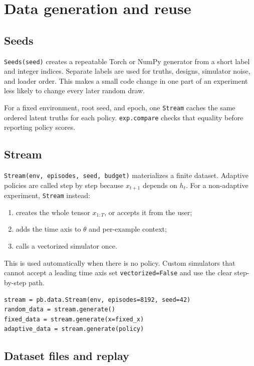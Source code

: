 \documentclass[11pt]{article}
\begin{document}
\section{Data generation and reuse}

\subsection{Seeds}

\texttt{Seeds(seed)} creates a repeatable Torch or NumPy generator from a short
label and integer indices. Separate labels are used for truths, designs, simulator
noise, and loader order. This makes a small code change in one part of an
experiment less likely to change every later random draw.

For a fixed environment, root seed, and epoch, one \texttt{Stream} caches the same
ordered latent truths for each policy. \texttt{exp.compare} checks that equality
before reporting policy scores.

\subsection{Stream}

\texttt{Stream(env, episodes, seed, budget)} materializes a finite dataset.
Adaptive policies are called step by step because $x_{t+1}$ depends on $h_t$.
For a non-adaptive experiment, \texttt{Stream} instead:
\begin{enumerate}
  \item creates the whole tensor $x_{1:T}$, or accepts it from the user;
  \item adds the time axis to $\theta$ and per-example context;
  \item calls a vectorized simulator once.
\end{enumerate}
This is used automatically when there is no policy. Custom simulators that cannot
accept a leading time axis set \texttt{vectorized=False} and use the clear
step-by-step path.

\begin{lstlisting}
stream = pb.data.Stream(env, episodes=8192, seed=42)
random_data = stream.generate()
fixed_data = stream.generate(x=fixed_x)
adaptive_data = stream.generate(policy)
\end{lstlisting}

\subsection{Dataset files and replay}
\end{document}
